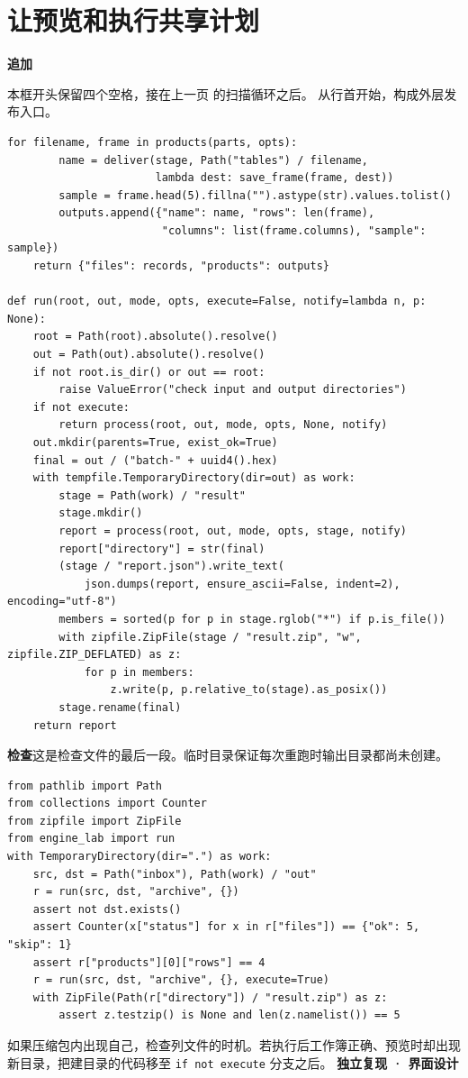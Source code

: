 \documentclass[UTF8,11pt,a4paper,fontset=fandol]{ctexart}
\newcommand{\file}[1]{\texttt{\detokenize{#1}}}
\newcommand{\partlabel}[1]{{\small\bfseries\color{accent}#1}\par}
\newcommand{\stepfile}[2]{\textbf{#1}\quad\file{#2}\par}
\begin{document}
\section{让预览和执行共享计划}\label{lab:publish}
\stepfile{追加}{engine_lab.py}
本框开头保留四个空格，接在上一页 \file{process} 的扫描循环之后。\file{run} 从行首开始，构成外层发布入口。
\begin{lstlisting}[style=lab]
    for filename, frame in products(parts, opts):
        name = deliver(stage, Path("tables") / filename,
                       lambda dest: save_frame(frame, dest))
        sample = frame.head(5).fillna("").astype(str).values.tolist()
        outputs.append({"name": name, "rows": len(frame),
                        "columns": list(frame.columns), "sample": sample})
    return {"files": records, "products": outputs}

def run(root, out, mode, opts, execute=False, notify=lambda n, p: None):
    root = Path(root).absolute().resolve()
    out = Path(out).absolute().resolve()
    if not root.is_dir() or out == root:
        raise ValueError("check input and output directories")
    if not execute:
        return process(root, out, mode, opts, None, notify)
    out.mkdir(parents=True, exist_ok=True)
    final = out / ("batch-" + uuid4().hex)
    with tempfile.TemporaryDirectory(dir=out) as work:
        stage = Path(work) / "result"
        stage.mkdir()
        report = process(root, out, mode, opts, stage, notify)
        report["directory"] = str(final)
        (stage / "report.json").write_text(
            json.dumps(report, ensure_ascii=False, indent=2), encoding="utf-8")
        members = sorted(p for p in stage.rglob("*") if p.is_file())
        with zipfile.ZipFile(stage / "result.zip", "w", zipfile.ZIP_DEFLATED) as z:
            for p in members:
                z.write(p, p.relative_to(stage).as_posix())
        stage.rename(final)
    return report
\end{lstlisting}
\textbf{检查}\quad 这是检查文件的最后一段。临时目录保证每次重跑时输出目录都尚未创建。
\begin{lstlisting}[style=lab]
from pathlib import Path
from collections import Counter
from zipfile import ZipFile
from engine_lab import run
with TemporaryDirectory(dir=".") as work:
    src, dst = Path("inbox"), Path(work) / "out"
    r = run(src, dst, "archive", {})
    assert not dst.exists()
    assert Counter(x["status"] for x in r["files"]) == {"ok": 5, "skip": 1}
    assert r["products"][0]["rows"] == 4
    r = run(src, dst, "archive", {}, execute=True)
    with ZipFile(Path(r["directory"]) / "result.zip") as z:
        assert z.testzip() is None and len(z.namelist()) == 5
\end{lstlisting}
如果压缩包内出现自己，检查列文件的时机。若执行后工作簿正确、预览时却出现新目录，把建目录的代码移至 \verb|if not execute| 分支之后。
\newpage
\partlabel{独立复现 · 界面设计}
\end{document}
